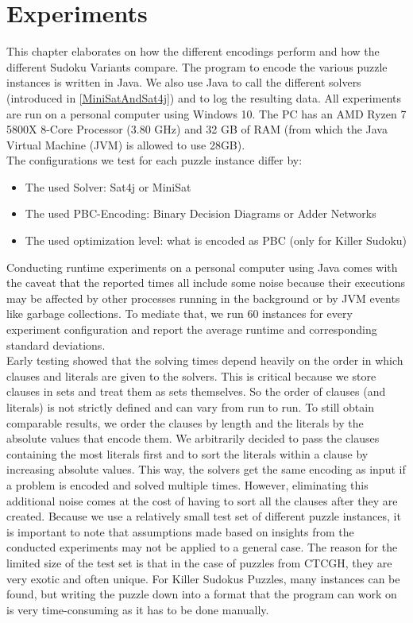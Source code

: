 \chapter{Experiments}\label{Experiments}
This chapter elaborates on how the different encodings perform and how the different Sudoku Variants compare.
The program to encode the various  puzzle instances is written in Java. We also use Java to call the different solvers (introduced in \ref{MiniSatAndSat4j}) and to log the resulting data. All experiments are run on a personal computer using Windows 10. The PC has an AMD Ryzen 7 5800X 8-Core Processor (3.80 GHz) and 32 GB of RAM (from which the Java Virtual Machine (JVM) is allowed to use 28GB).\\

The configurations we test for each puzzle instance differ by: 
\begin{itemize}
    \item The used Solver: Sat4j or MiniSat
    \item The used PBC-Encoding: Binary Decision Diagrams or Adder Networks
    \item The used optimization level: what is encoded as PBC (only for Killer Sudoku)
\end{itemize}

Conducting runtime experiments on a personal computer using Java comes with the caveat that the reported times all include some noise because their executions may be affected by other processes running in the background or by JVM events like garbage collections. To mediate that, we run 60 instances for every experiment configuration and report the average runtime and corresponding standard deviations.\\


Early testing showed that the solving times depend heavily on the order in which clauses and literals are given to the solvers. This is critical because we store clauses in sets and treat them as sets themselves. So the order of clauses (and literals) is not strictly defined and can vary from run to run. To still obtain comparable results, we order the clauses by length and the literals by the absolute values that encode them. We arbitrarily decided to pass the clauses containing the most literals first and to sort the literals within a clause by increasing absolute values. This way, the solvers get the same encoding as input if a problem is encoded and solved multiple times. However, eliminating this additional noise comes at the cost of having to sort all the clauses after they are created.
\newpage
Because we use a relatively small test set of different puzzle instances, it is important to note that assumptions made based on insights from the conducted experiments may not be applied to a general case. The reason for the limited size of the test set is that in the case of puzzles from CTCGH, they are very exotic and often unique. For Killer Sudokus Puzzles, many instances can be found, but writing the puzzle down into a format that the program can work on is very time-consuming as it has to be done manually.

